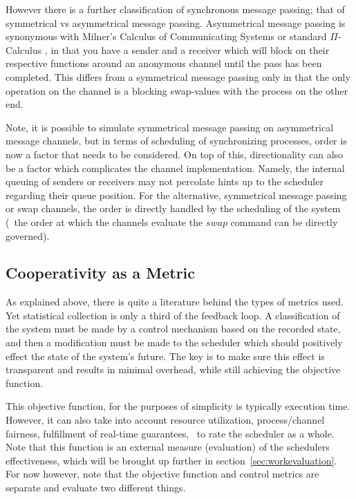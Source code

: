However there is a further classification of synchronous message passing; that of symmetrical vs asymmetrical message passing. 
Asymmetrical message passing is synonymous with Milner's Calculus of Communicating Systems \cite{milner1982calculus} 
or standard $\Pi$-Calculus \cite{palamidessi1997comparing}, in that you have a sender and a receiver which will 
block on their respective functions around an anonymous channel until the pass has been completed. This differs from a 
symmetrical message passing only in that the only operation on the channel is a blocking swap-values with the
process on the other end. 

Note, it is possible to simulate symmetrical message passing on asymmetrical message channels, but in terms of scheduling of
synchronizing processes, order is now a factor that needs to be considered. On top of this, directionality can also be a factor
which complicates the channel implementation. Namely, the internal queuing of senders or receivers may not percolate hints up to
the scheduler regarding their queue position. For the alternative, symmetrical message passing or swap channels, the order is
directly handled by the scheduling of the system (\ie~the order at which the channels evaluate the $swap$ command can be 
directly governed).

\subsection{Cooperativity as a Metric}

As explained above, there is quite a literature behind the types of metrics used. Yet statistical collection is 
only a third of the feedback loop. A classification of the system must be made by a control mechanism based on the 
recorded state, and then a modification must be made to the scheduler which should positively 
effect the state of the system's future. The key is to make sure this effect is transparent and results in minimal
overhead, while still achieving the objective function.

This objective function, for the purposes of simplicity is typically execution time. However, it can also take into
account resource utilization, process/channel fairness, fulfillment of real-time guarantees, \etc~to rate the 
scheduler as a whole. Note that this function is an external measure (evaluation) of the schedulers effectiveness,
which will be brought up further in section~\ref{sec:workevaluation}. For now however, note that the objective 
function and control metrics are separate and evaluate two different things.


